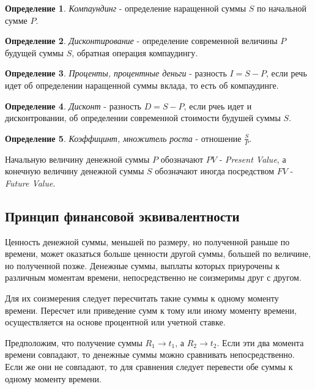\documentclass[aps,%
12pt,%
final,%
oneside,
onecolumn,%
musixtex, %
superscriptaddress,%
centertags]{article} %
\theoremstyle{plain}
\theoremstyle{definition}
\newtheorem{definition}{Определение}[subsection]
\theoremstyle{remark}
\begin{document}
\begin{definition}
\textit{Компаундинг} - определение наращенной суммы $S$ по начальной сумме $P$.
\end{definition}

\begin{definition}
\textit{Дисконтирование} - определение современной величины $P$ будущей суммы $S$, обратная операция компаудингу.
\end{definition}

\begin{definition}
\textit{Проценты, процентные деньги} - разность $I=S-P$, если речь идет об определении наращенной суммы вклада, то есть об компаудинге.
\end{definition}

\begin{definition}
\textit{Дисконт} - разность $D = S-P$, если рчеь идет и дисконтровании, об определении современной стоимости будушей суммы $S$.
\end{definition}

\begin{definition}
\textit{Коэффицинт, множитель роста} - отношение $\frac{S}{P}$.
\end{definition}

Начальную величину денежной суммы $P$ обозначают $PV$ - \textit{Present Value}, а конечную величину денежной суммы $S$ обозначают иногда посредством $FV$ - \textit{Future Value}.


\subsection{Принцип финансовой эквивалентности}

Ценность денежной суммы, меньшей по размеру, но полученной раньше по времени, может оказаться больше ценности другой суммы, большей по величине, но полученной позже. Денежные суммы, выплаты которых приурочены к различным моментам времени, непосредственно не соизмеримы друг с другом.

Для их соизмерения следует пересчитать такие суммы к одному моменту времени. Пересчет или приведение сумм к тому или иному моменту времени, осуществляется на основе процентной или учетной ставке.

Предположим, что получение суммы $R_1 \to t_1$, а $R_2 \to t_2$. Если эти два момента времени совпадают, то денежные суммы можно сравнивать непосредственно. Если же они не совпадают, то для сравнения следует перевести обе суммы к одному моменту времени.
\end{document}
